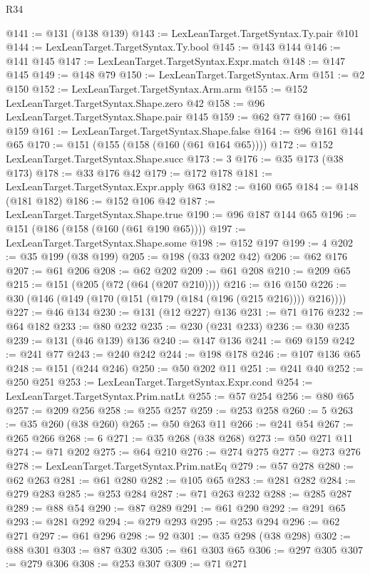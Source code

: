 \begin{lexlean}{R34}
\begin{coremodule}
@141 := @131 (@138 @139)
@143 := LexLeanTarget.TargetSyntax.Ty.pair @101
@144 := LexLeanTarget.TargetSyntax.Ty.bool
@145 := @143 @144
@146 := @141 @145
@147 := LexLeanTarget.TargetSyntax.Expr.match
@148 := @147 @145
@149 := @148 @79
@150 := LexLeanTarget.TargetSyntax.Arm
@151 := @2 @150
@152 := LexLeanTarget.TargetSyntax.Arm.arm
@155 := @152 LexLeanTarget.TargetSyntax.Shape.zero @42
@158 := @96 LexLeanTarget.TargetSyntax.Shape.pair @145
@159 := @62 @77
@160 := @61 @159
@161 := LexLeanTarget.TargetSyntax.Shape.false
@164 := @96 @161 @144 @65
@170 := @151 (@155 (@158 (@160 (@61 @164 @65))))
@172 := @152 LexLeanTarget.TargetSyntax.Shape.succ
@173 := 3
@176 := @35 @173 (@38 @173)
@178 := @33 @176 @42
@179 := @172 @178
@181 := LexLeanTarget.TargetSyntax.Expr.apply @63
@182 := @160 @65
@184 := @148 (@181 @182)
@186 := @152 @106 @42
@187 := LexLeanTarget.TargetSyntax.Shape.true
@190 := @96 @187 @144 @65
@196 := @151 (@186 (@158 (@160 (@61 @190 @65))))
@197 := LexLeanTarget.TargetSyntax.Shape.some
@198 := @152 @197
@199 := 4
@202 := @35 @199 (@38 @199)
@205 := @198 (@33 @202 @42)
@206 := @62 @176
@207 := @61 @206
@208 := @62 @202
@209 := @61 @208
@210 := @209 @65
@215 := @151 (@205 (@72 (@64 (@207 @210))))
@216 := @16 @150
@226 := @30 (@146 (@149 (@170 (@151 (@179 (@184 (@196 (@215 @216)))) @216))))
@227 := @46 @134
@230 := @131 (@12 @227) @136
@231 := @71 @176
@232 := @64 @182
@233 := @80 @232
@235 := @230 (@231 @233)
@236 := @30 @235
@239 := @131 (@46 @139) @136
@240 := @147 @136
@241 := @69 @159
@242 := @241 @77
@243 := @240 @242
@244 := @198 @178
@246 := @107 @136 @65
@248 := @151 (@244 @246)
@250 := @50 @202 @11
@251 := @241 @40
@252 := @250 @251
@253 := LexLeanTarget.TargetSyntax.Expr.cond
@254 := LexLeanTarget.TargetSyntax.Prim.natLt
@255 := @57 @254
@256 := @80 @65
@257 := @209 @256
@258 := @255 @257
@259 := @253 @258
@260 := 5
@263 := @35 @260 (@38 @260)
@265 := @50 @263 @11
@266 := @241 @54
@267 := @265 @266
@268 := 6
@271 := @35 @268 (@38 @268)
@273 := @50 @271 @11
@274 := @71 @202
@275 := @64 @210
@276 := @274 @275
@277 := @273 @276
@278 := LexLeanTarget.TargetSyntax.Prim.natEq
@279 := @57 @278
@280 := @62 @263
@281 := @61 @280
@282 := @105 @65
@283 := @281 @282
@284 := @279 @283
@285 := @253 @284
@287 := @71 @263 @232
@288 := @285 @287
@289 := @88 @54
@290 := @87 @289
@291 := @61 @290
@292 := @291 @65
@293 := @281 @292
@294 := @279 @293
@295 := @253 @294
@296 := @62 @271
@297 := @61 @296
@298 := 92
@301 := @35 @298 (@38 @298)
@302 := @88 @301
@303 := @87 @302
@305 := @61 @303 @65
@306 := @297 @305
@307 := @279 @306
@308 := @253 @307
@309 := @71 @271

\end{coremodule}
\end{lexlean}
